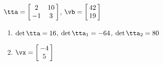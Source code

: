 {$\tta = \left[\hskip -3pt \begin{array}{cc} 2&10\\  -1&3\end {array} \hskip -3pt
 \right]$,
 \quad
$\vb = \left[\hskip -3pt \begin{array}{c} 42\\  19\end {array} \hskip -3pt
 \right]$}
{\begin{enumerate}
\item	$\det{\tta} = 16$, $\det{\tta_1} = -64$, $\det{\tta_2} = 80$
\item $\vx = \left[\hskip -3pt \begin{array}{c} -4\\  5\end{array}\hskip -3pt \right]$
\end{enumerate}
}
  

